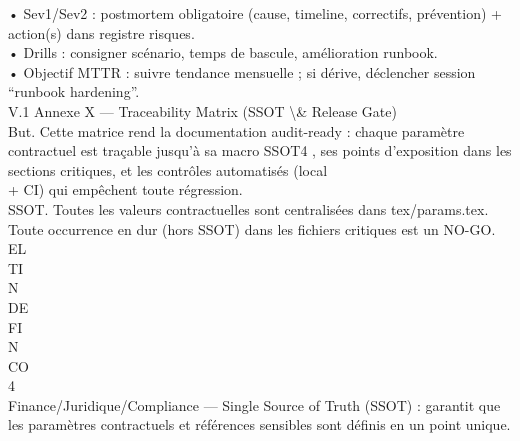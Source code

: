 • Sev1/Sev2 : postmortem obligatoire (cause, timeline, correctifs, prévention) + action(s) dans registre risques.\\
\vspace{0.5em}
• Drills : consigner scénario, temps de bascule, amélioration runbook.\\
\vspace{0.5em}
• Objectif MTTR : suivre tendance mensuelle ; si dérive, déclencher session “runbook hardening”.\\
\vspace{0.5em}
\vspace{0.5em}
\vspace{0.5em}
\vspace{0.5em}
V.1 Annexe X — Traceability Matrix (SSOT \textbackslash{}& Release Gate)\\
But. Cette matrice rend la documentation audit-ready : chaque paramètre contractuel est traçable jusqu’à sa macro SSOT4 , ses points d’exposition dans les sections critiques, et les contrôles automatisés (local\\
\vspace{0.5em}
+ CI) qui empêchent toute régression.\\
\vspace{0.5em}
SSOT. Toutes les valeurs contractuelles sont centralisées dans tex/params.tex. Toute occurrence en dur (hors SSOT) dans les fichiers critiques est un NO-GO.\\
\vspace{0.5em}
\vspace{0.5em}
\vspace{0.5em}
\vspace{0.5em}
EL\\
TI\\
N\\
DE\\
FI\\
N\\
CO\\
\vspace{0.5em}
\vspace{0.5em}
\vspace{0.5em}
\vspace{0.5em}
4\\
Finance/Juridique/Compliance — Single Source of Truth (SSOT) : garantit que les paramètres contractuels et références sensibles sont définis en un point unique.\\
\vspace{0.5em}
\vspace{0.5em}
